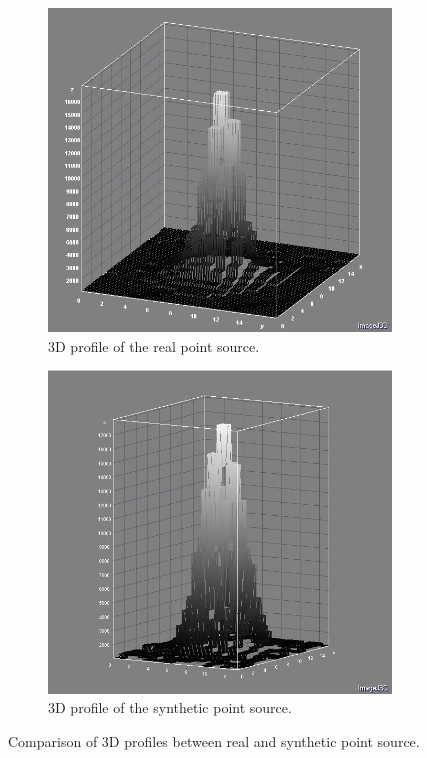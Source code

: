 \begin{figure}[H]
\centering
    \begin{subfigure}[t]{.4\textwidth}
        \centering
        \includegraphics[width=\textwidth]{images/realPoint3D.JPG}
        \caption{3D profile of the real point source.}
        \label{fig:point3D1}
    \end{subfigure}
    \begin{subfigure}[t]{.4\textwidth}
        \centering
        \includegraphics[width=\textwidth]{images/synpoint3D.JPG}
        \caption{3D profile of the synthetic point source.}
        \label{fig:point3D2}
    \end{subfigure}

    \caption{Comparison of 3D profiles between real and synthetic point source.}
    \label{fig:point3D}
\end{figure}

